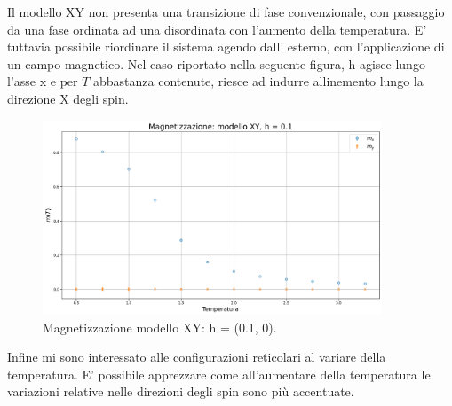 Il modello XY non presenta una transizione di fase convenzionale, con passaggio da una fase ordinata ad 
una disordinata con l'aumento della temperatura. E' tuttavia possibile riordinare il sistema agendo dall'
esterno, con l'applicazione di un campo magnetico. Nel caso riportato nella seguente figura, h agisce lungo l'asse x e per 
$T$ abbastanza contenute, riesce ad indurre allinemento lungo la direzione X degli spin.

\begin{figure}[H]
  \centering
  \includegraphics[width=0.9\textwidth]{Immagini/simModelloXY/magnX.png}
  \caption{Magnetizzazione modello XY: h = (0.1, 0).}
  \label{fig: magnX_XY}
\end{figure}

Infine mi sono interessato alle configurazioni reticolari al variare della temperatura. E' possibile 
apprezzare come all'aumentare della temperatura le variazioni relative nelle direzioni degli spin sono 
più accentuate.

\vspace*{\fill}

